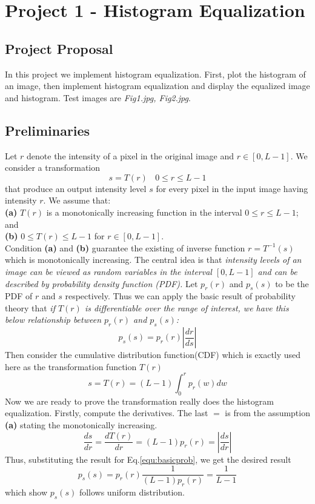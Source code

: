 \section{Project 1 - Histogram Equalization}

\subsection{Project Proposal}
In this project we implement histogram equalization. First, plot the histogram of an image, then implement histogram equalization and display the equalized image and histogram. Test images are \emph{Fig1.jpg, Fig2.jpg}.

\subsection{Preliminaries}
Let $r$ denote the intensity of a pixel in the original image and $r \in [0,L-1]$. We consider a transformation \begin{equation}s=T(r) ~~~~ 0 \leq r \leq L-1 \end{equation} that produce an output intensity level $s$ for every pixel in the input image having intensity $r$. We assume that:
\\ \textbf{(a)} $T(r)$ is a monotonically increasing function in the interval $0 \leq r \leq L-1$; and \\
\textbf{(b)} $0 \leq T(r) \leq L-1$ for $r \in [0, L-1]$. \\
Condition \textbf{(a)} and \textbf{(b)} guarantee the existing of inverse function $r=T^{-1}(s)$ which is monotonically increasing. 
The central idea is that \emph{intensity levels of an image can be viewed as random variables in the interval $[0, L-1]$ and can be described by probability density function (PDF).} Let $p_r(r)$ and $p_s(s)$ to be the PDF of $r$ and $s$ respectively. Thus we can apply the basic result of probability theory that \emph{if $T(r)$ is differentiable over the range of interest, we have this below relationship between $p_r(r)$ and $p_s(s)$: }
\begin{equation} p_s(s)=p_r(r) \left| \frac{dr}{ds} \right| \label{equ:basicprob} \end{equation}
Then consider the cumulative distribution function(CDF) which is exactly used here as the transformation function $T(r)$ \begin{equation} s=T(r)=(L-1) \int_0^r p_r(w)dw  \label{equ:histEquTrans} \end{equation}
Now we are ready to prove the transformation really does the histogram equalization. Firstly, compute the derivatives. The last $=$ is from the assumption \textbf{(a)} stating the monotonically increasing.
\begin{equation} \frac{ds}{dr}=\frac{dT(r)}{dr}=(L-1)p_r(r) = \left| \frac{ds}{dr} \right| \end{equation}
Thus, substituting the result for Eq.\ref{equ:basicprob}, we get the desired result
\begin{equation} p_s(s) = p_r(r) \frac{1}{(L-1)p_r(r)} = \frac{1}{L-1} \end{equation}
which show $p_s(s)$ follows uniform distribution.

